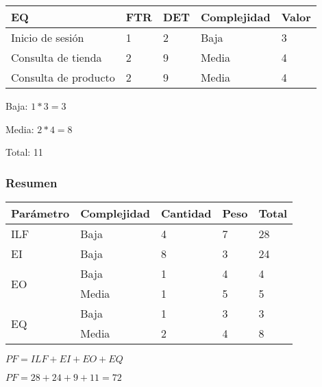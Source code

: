 \begin{itemize}
    \begin{table}[H]
        \centering
        \begin{tabular}{|l|l|l|l|l|}
            \hline
            EQ                   & FTR & DET & Complejidad & Valor \\ \hline
            Inicio de sesión     & 1   & 2   & Baja        & 3     \\ \hline
            Consulta de tienda   & 2   & 9   & Media       & 4     \\ \hline
            Consulta de producto & 2   & 9   & Media       & 4     \\
            \hline
        \end{tabular}
    \end{table}
    
    Baja: $1 * 3 = 3$
    
    Media: $2 * 4 = 8$
    
    Total: 11
    
\end{itemize}

    \subsubsection{Resumen}
    
    \begin{table}[H]
        \centering
        \begin{tabular}{|l|l|l|l|l|}
            \hline
            Parámetro & Complejidad & Cantidad & Peso & Total \\ \hline
        ILF       & Baja        & 4        & 7    & 28    \\ \hline
        EI        & Baja        & 8        & 3    & 24    \\ \hline
        \multirow{2}{*}{EO}        & Baja        & 1        & 4    & 4     \\ \cline{2-5}
                & Media       & 1        & 5    & 5     \\ \hline
        \multirow{2}{*}{EQ}        & Baja        & 1        & 3    & 3     \\ \cline{2-5}
                 & Media       & 2        & 4    & 8     \\ \hline
    \end{tabular}
\end{table}
    
    $PF = ILF + EI + EO + EQ$
    
    $PF = 28 + 24 + 9 + 11 = 72$
    
